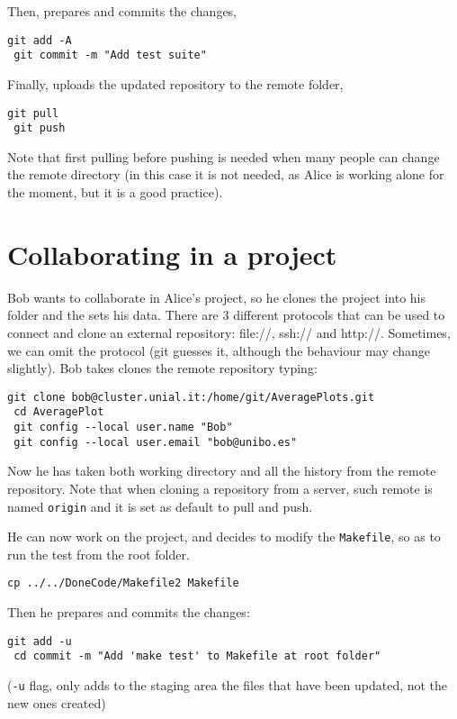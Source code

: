 \documentclass[a4paper,10pt]{article}
\begin{document}
Then, prepares and commits the changes,

\begin{lstlisting}[style=Alice]
 git add -A
 git commit -m "Add test suite"
\end{lstlisting}

Finally, uploads the updated repository to the remote folder,

\begin{lstlisting}[style=Alice]
 git pull
 git push
\end{lstlisting}
Note that first pulling before pushing is needed when many people can change the remote directory (in this case it is not needed, as Alice is working alone for the moment, but it is a good practice).

\clearpage

\section{Collaborating in a project}
Bob wants to collaborate in Alice's project, so he clones the project into his folder and the sets his data. There are 3 different protocols that can be used to connect and clone an external repository: file://, ssh:// and http://. Sometimes, we can omit the protocol (git guesses it, although the behaviour may change slightly). Bob takes clones the remote repository typing:

\begin{lstlisting}[style=Bob]
 git clone bob@cluster.unial.it:/home/git/AveragePlots.git
 cd AveragePlot
 git config --local user.name "Bob"
 git config --local user.email "bob@unibo.es"
\end{lstlisting}

Now he has taken both working directory and all the history from the remote repository. Note that when cloning a repository from a server, such remote is named \texttt{origin} and it is set as default to pull and push.

He can now work on the project, and decides to modify the \texttt{Makefile}, so as to run the test from the root folder.

\begin{lstlisting}[style=BobFake]
 cp ../../DoneCode/Makefile2 Makefile
\end{lstlisting}

Then he prepares and commits the changes:

\begin{lstlisting}[style=Bob]
 git add -u
 cd commit -m "Add 'make test' to Makefile at root folder"
\end{lstlisting}
(\texttt{-u} flag, only adds to the staging area the files that have been updated, not the new ones created)
\end{document}
